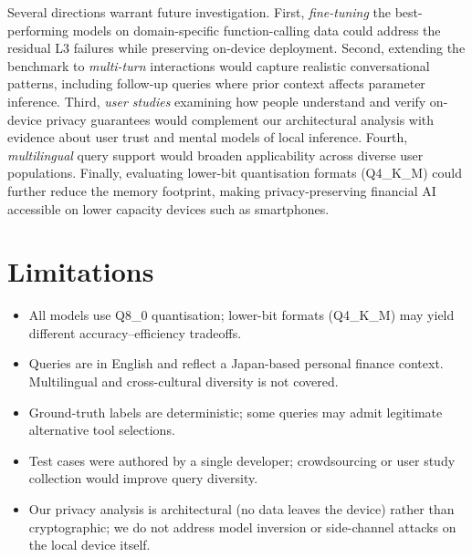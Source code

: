 \documentclass[11pt,twocolumn]{article}
\begin{document}
Several directions warrant future investigation.
First, \emph{fine-tuning} the best-performing models on
domain-specific function-calling data could address the residual L3
failures while preserving on-device deployment.
Second, extending the benchmark to \emph{multi-turn} interactions
would capture realistic conversational patterns, including follow-up
queries where prior context affects parameter inference.
Third, \emph{user studies} examining how people understand and verify
on-device privacy guarantees would complement our architectural
analysis with evidence about user trust and mental models of local
inference.
Fourth, \emph{multilingual} query support would broaden applicability
across diverse user populations.
Finally, evaluating lower-bit quantisation formats (Q4\_K\_M) could
further reduce the memory footprint, making privacy-preserving
financial AI accessible on lower capacity devices such as smartphones.

\section*{Limitations}

\begin{itemize}\itemsep=0pt \parskip=0pt \parsep=0pt
    \item All models use Q8\_0 quantisation; lower-bit formats
          (Q4\_K\_M) may yield different accuracy--efficiency
          tradeoffs.
    \item Queries are in English and reflect a Japan-based personal
          finance context. Multilingual and cross-cultural diversity
          is not covered.
    \item Ground-truth labels are deterministic; some queries may
          admit legitimate alternative tool selections.
    \item Test cases were authored by a single developer; crowdsourcing
          or user study collection would improve query diversity.
    \item Our privacy analysis is architectural (no data leaves the
          device) rather than cryptographic; we do not address model
          inversion or side-channel attacks on the local device itself.
\end{itemize}

\end{document}
